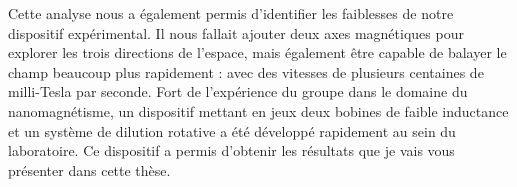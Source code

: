 
Cette analyse nous a également permis d'identifier les faiblesses de notre dispositif expérimental. Il nous fallait ajouter deux axes magnétiques pour explorer les trois directions de l'espace, mais également être capable de balayer le champ beaucoup plus rapidement : avec des vitesses de plusieurs centaines de milli-Tesla par seconde. Fort de l'expérience du groupe dans le domaine du nanomagnétisme, un dispositif mettant en jeux deux bobines de faible inductance et un système de dilution rotative a été développé rapidement au sein du laboratoire. Ce dispositif a permis d'obtenir les résultats que je vais vous présenter dans cette thèse.

